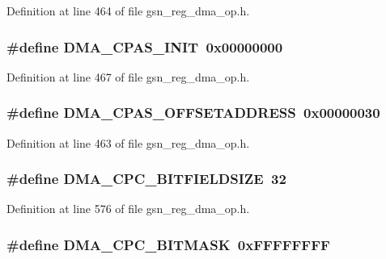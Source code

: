 Definition at line 464 of file gsn\_\-reg\_\-dma\_\-op.h.

\hypertarget{a00547_a28d602f9acd61477951276ecf61ae35a}{
\subsubsection[{DMA\_\-CPAS\_\-INIT}]{\setlength{\rightskip}{0pt plus 5cm}\#define DMA\_\-CPAS\_\-INIT~0x00000000}}
\label{a00547_a28d602f9acd61477951276ecf61ae35a}


Definition at line 467 of file gsn\_\-reg\_\-dma\_\-op.h.

\hypertarget{a00547_a2d0e0c971d49c174c17485ec07bfd858}{
\subsubsection[{DMA\_\-CPAS\_\-OFFSETADDRESS}]{\setlength{\rightskip}{0pt plus 5cm}\#define DMA\_\-CPAS\_\-OFFSETADDRESS~0x00000030}}
\label{a00547_a2d0e0c971d49c174c17485ec07bfd858}


Definition at line 463 of file gsn\_\-reg\_\-dma\_\-op.h.

\hypertarget{a00547_a7ac4c3c92092bff10cd763c503fe5777}{
\subsubsection[{DMA\_\-CPC\_\-BITFIELDSIZE}]{\setlength{\rightskip}{0pt plus 5cm}\#define DMA\_\-CPC\_\-BITFIELDSIZE~32}}
\label{a00547_a7ac4c3c92092bff10cd763c503fe5777}


Definition at line 576 of file gsn\_\-reg\_\-dma\_\-op.h.

\hypertarget{a00547_a6c781d0134dfdae9d772eb8729653b88}{
\subsubsection[{DMA\_\-CPC\_\-BITMASK}]{\setlength{\rightskip}{0pt plus 5cm}\#define DMA\_\-CPC\_\-BITMASK~0xFFFFFFFF}}
\label{a00547_a6c781d0134dfdae9d772eb8729653b88}


